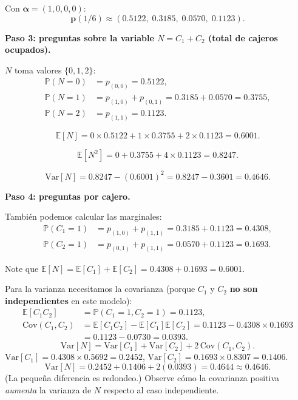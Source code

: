 \documentclass[11pt,a4paper]{article}
\theoremstyle{definition}
\theoremstyle{remark}
\newcommand{\E}{\mathbb{E}}
\newcommand{\Var}{\mathrm{Var}}
\newcommand{\Prob}{\mathbb{P}}
\begin{document}
\begin{ejemplo}
Con $\boldsymbol{\alpha}=(1,0,0,0)$:
\[
  \boldsymbol{p}(1/6) \approx (0.5122,\;0.3185,\;0.0570,\;0.1123).
\]

\textbf{Paso 3: preguntas sobre la variable $N = C_1+C_2$ (total de
cajeros ocupados).}

$N$ toma valores $\{0,1,2\}$:
\begin{align*}
  \Prob(N=0) &= p_{(0,0)} = 0.5122, \\
  \Prob(N=1) &= p_{(1,0)} + p_{(0,1)} = 0.3185 + 0.0570 = 0.3755, \\
  \Prob(N=2) &= p_{(1,1)} = 0.1123.
\end{align*}

\[
  \E[N] = 0\times 0.5122 + 1\times 0.3755 + 2\times 0.1123 = 0.6001.
\]

\[
  \E[N^2] = 0 + 0.3755 + 4\times 0.1123 = 0.8247.
\]

\[
  \Var[N] = 0.8247 - (0.6001)^2 = 0.8247 - 0.3601 = 0.4646.
\]

\textbf{Paso 4: preguntas por cajero.}

También podemos calcular las marginales:
\begin{align*}
  \Prob(C_1=1) &= p_{(1,0)} + p_{(1,1)} = 0.3185 + 0.1123 = 0.4308, \\
  \Prob(C_2=1) &= p_{(0,1)} + p_{(1,1)} = 0.0570 + 0.1123 = 0.1693.
\end{align*}

Note que $\E[N] = \E[C_1]+\E[C_2] = 0.4308+0.1693 = 0.6001$. \checkmark

Para la varianza necesitamos la covarianza (porque $C_1$ y $C_2$ \textbf{no
son independientes} en este modelo):
\begin{align*}
  \E[C_1 C_2] &= \Prob(C_1=1,C_2=1) = 0.1123, \\
  \mathrm{Cov}(C_1,C_2) &= \E[C_1 C_2]-\E[C_1]\E[C_2]
  = 0.1123 - 0.4308\times 0.1693 \\
  &= 0.1123 - 0.0730 = 0.0393.
\end{align*}
\[
  \Var[N] = \Var[C_1]+\Var[C_2]+2\,\mathrm{Cov}(C_1,C_2).
\]
$\Var[C_1] = 0.4308\times 0.5692 = 0.2452$, \quad
$\Var[C_2] = 0.1693\times 0.8307 = 0.1406$.
\[
  \Var[N] = 0.2452+0.1406+2(0.0393) = 0.4644 \approx 0.4646.
\]
(La pequeña diferencia es redondeo.)  Observe cómo la covarianza positiva
\emph{aumenta} la varianza de $N$ respecto al caso independiente.
\end{ejemplo}



\end{document}
